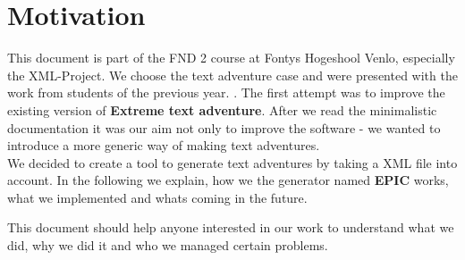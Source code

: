 \chapter{Motivation}
This document is part of the FND 2 course at Fontys Hogeshool Venlo, especially the XML-Project.
We choose the text adventure case and were presented with the work from students of the previous year. .
The first attempt was to improve the existing version of \textbf{Extreme text adventure}. After we read the minimalistic documentation it was our aim not only to improve the software - we wanted to introduce a more generic way of making text adventures.\\

We decided to create a tool to generate text adventures by taking a XML file into account. In the following we explain, how we the generator named \textbf{EPIC} works, what we implemented and whats coming in the future.

This document should help anyone interested in our work to understand what we did, why we did it and who we managed certain problems.



